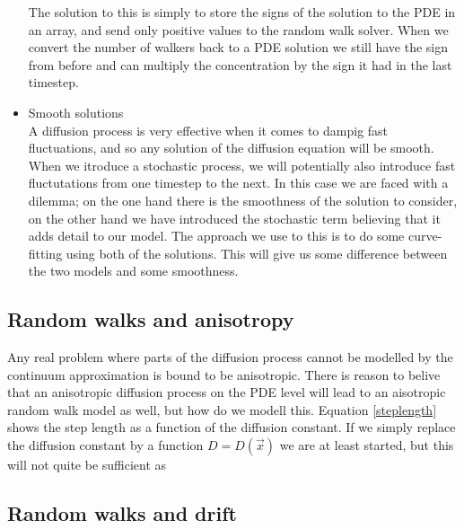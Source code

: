 \begin{itemize}
 The solution to this is simply to store the signs of the solution to the PDE in an array, and send only positive values to the random walk solver. 
 When we convert the number of walkers back to a PDE solution we still have the sign from before and can multiply the concentration by the sign it had in the last timestep. 
 \item Smooth solutions\\
 A diffusion process is very effective when it comes to dampig fast fluctuations, and so any solution of the diffusion equation will be smooth. 
 When we itroduce a stochastic process, we will potentially also introduce fast fluctutations from one timestep to the next. 
 In this case we are faced with a dilemma; on the one hand there is the smoothness of the solution to consider, on the other hand we have introduced the stochastic term believing that it adds detail to our model. 
 The approach we use to this is to do some curve-fitting using both of the solutions. 
 This will give us some difference between the two models and some smoothness.

\end{itemize}

\subsection{Random walks and anisotropy}\label{random_walks_and_anisotropy}

Any real problem where parts of the diffusion process cannot be modelled by the continuum approximation is bound to be anisotropic. 
There is reason to belive that an anisotropic diffusion process on the PDE level will lead to an aisotropic random walk model as well, but how do we modell this. 
Equation \ref{steplength} shows the step length as a function of the diffusion constant. 
If we simply replace the diffusion constant by a function $D = D(\vec{x})$ we are at least started, but this will not quite be sufficient as 

\subsection{Random walks and drift}\label{random_walks_and_drift}

